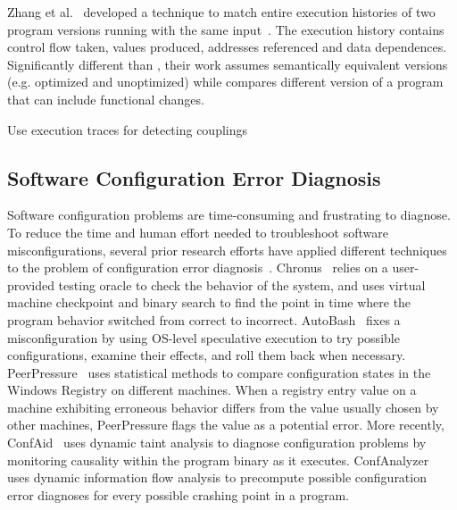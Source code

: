 Zhang et al.~\cite{} developed a technique to match entire
execution histories of two program versions running with
the same input~\cite{}. The execution history contains control
flow taken, values produced, addresses referenced and
data dependences. Significantly different than \ourtool, their
work assumes semantically equivalent versions (e.g. optimized
and unoptimized) while \ourtool compares different version of
a program that can include functional changes. 

Use execution traces for detecting couplings~\cite{Giroux:2006:DIF}


\subsection{Software Configuration Error Diagnosis}

Software configuration problems are time-consuming
and frustrating to diagnose. To reduce the time and human
effort needed to troubleshoot software misconfigurations,
several prior research efforts have applied different techniques
to the problem of configuration error diagnosis~\cite{Attariyan:2008:UCD, 
Whitaker:2004:CDS, Wang:2004:AMT,
Attariyan:2010:ACT, Rabkin:2011:PPC, keller:conferr}.
Chronus~\cite{Whitaker:2004:CDS} relies on a user-provided
testing oracle to check the behavior of the system, and uses
virtual machine checkpoint and binary search to find the
point in time where the program behavior
switched from correct to incorrect. AutoBash~\cite{Su:2007:AIC}
fixes a misconfiguration by using
OS-level speculative execution to try possible
configurations, examine their effects, and roll them back when necessary.
PeerPressure~\cite{Wang:2004:AMT} 
uses statistical methods to compare
configuration states in the Windows Registry on different machines.
When a registry entry value on a machine exhibiting erroneous behavior differs
from the value usually chosen by other machines, PeerPressure
flags the value as a potential error. More recently, ConfAid~\cite{Attariyan:2010:ACT}
uses dynamic taint analysis to diagnose configuration problems 
by monitoring causality within the program binary as it executes.
ConfAnalyzer~\cite{Rabkin:2011:PPC} uses dynamic information flow analysis to precompute
possible configuration error diagnoses for every possible crashing point
in a program. 

